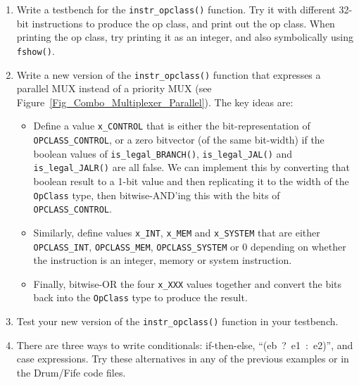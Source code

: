 \begin{enumerate}

  \item Write a testbench for the \verb|instr_opclass()| function. Try
    it with different 32-bit instructions to produce the op class, and
    print out the op class.  When printing the op class, try printing
    it as an integer, and also symbolically using \verb|fshow()|.

  \item Write a new version of the \verb|instr_opclass()| function
    that expresses a parallel MUX instead of a priority MUX (see
    Figure~\ref{Fig_Combo_Multiplexer_Parallel}). The key ideas are:

    \begin{itemize}

      \item Define a value \verb|x_CONTROL| that is either the
        bit-representation of \verb|OPCLASS_CONTROL|, or a zero
        bitvector (of the same bit-width) if the boolean values of
        \verb|is_legal_BRANCH()|, \verb|is_legal_JAL()| and
        \verb|is_legal_JALR()| are all false.  We can implement this
        by converting that boolean result to a 1-bit value and then
        replicating it to the width of the \verb|OpClass| type, then
        bitwise-AND'ing this with the bits of \verb|OPCLASS_CONTROL|.

      \item Similarly, define values \verb|x_INT|, \verb|x_MEM| and
        \verb|x_SYSTEM| that are either \verb|OPCLASS_INT|,
        \verb|OPCLASS_MEM|, \verb|OPCLASS_SYSTEM| or 0 depending on
        whether the instruction is an integer, memory or system
        instruction.

      \item Finally, bitwise-OR the four \verb|x_XXX| values together
        and convert the bits back into the {\tt OpClass} type to
        produce the result.

    \end{itemize}

  \item Test your new version of the \verb|instr_opclass()| function
    in your testbench.

  \item There are three ways to write conditionals: if-then-else,
    ``\mbox{(eb ? e1 : e2)}'', and case expressions.  Try these
    alternatives in any of the previous examples or in the Drum/Fife
    code files.

\end{enumerate}

